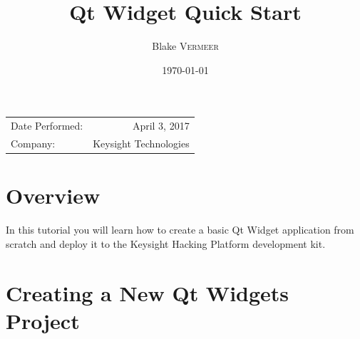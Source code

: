 \documentclass{article}
\title{Qt Widget Quick Start} %
\author{Blake \textsc{Vermeer}} %
\date{\today} %
\begin{document}
\maketitle %

\begin{center}
\begin{tabular}{l r}
Date Performed: & April 3, 2017 \\ %
Company: & Keysight Technologies %
\end{tabular}
\end{center}


\section{Overview}

In this tutorial you will learn how to create a basic Qt Widget application from scratch and deploy it to the Keysight Hacking Platform development kit.



\section{Creating a New Qt Widgets Project}
\end{document}
